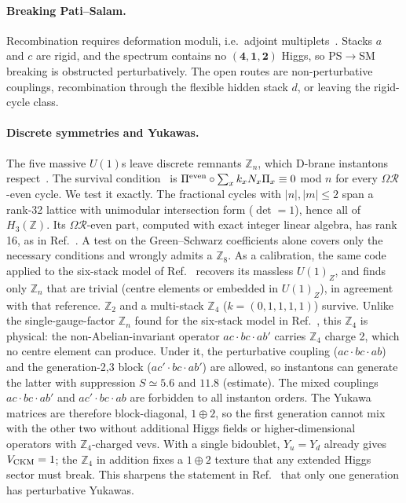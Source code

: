 \documentclass[aps,prd,twocolumn,superscriptaddress,nofootinbib,showkeys]{revtex4-2}
\begin{document}
\paragraph{Breaking Pati--Salam.} Recombination requires deformation moduli, i.e.\ adjoint multiplets~\cite{HRS}. Stacks $a$ and $c$ are rigid, and the spectrum contains no $(\mathbf4,\mathbf1,\mathbf2)$ Higgs, so PS$\to$SM breaking is obstructed perturbatively. The open routes are non-perturbative couplings, recombination through the flexible hidden stack $d$, or leaving the rigid-cycle class.

\paragraph{Discrete symmetries and Yukawas.} The five massive $U(1)$s leave discrete remnants $\mathbb Z_n$, which D-brane instantons respect~\cite{HS13,BIZn}. The survival condition~\cite{HS13} is $\Pi^{\rm even}\circ\sum_xk_xN_x\Pi_x\equiv0$ mod $n$ for every $\Omega\mathcal R$-even cycle. We test it exactly. The fractional cycles with $|n|,|m|\le2$ span a rank-32 lattice with unimodular intersection form ($\det=1$), hence all of $H_3(\mathbb Z)$. Its $\Omega\mathcal R$-even part, computed with exact integer linear algebra, has rank 16, as in Ref.~\cite{HS13}. A test on the Green--Schwarz coefficients alone covers only the necessary conditions and wrongly admits a $\mathbb Z_8$. As a calibration, the same code applied to the six-stack model of Ref.~\cite{HS13} recovers its massless $U(1)_Z$, and finds only $\mathbb Z_n$ that are trivial (centre elements or embedded in $U(1)_Z$), in agreement with that reference. $\mathbb Z_2$ and a multi-stack $\mathbb Z_4$ ($k=(0,1,1,1,1)$) survive. Unlike the single-gauge-factor $\mathbb Z_n$ found for the six-stack model in Ref.~\cite{HS13}, this $\mathbb Z_4$ is physical: the non-Abelian-invariant operator $ac\cdot bc\cdot ab'$ carries $\mathbb Z_4$ charge 2, which no centre element can produce. Under it, the perturbative coupling ($ac\cdot bc\cdot ab$) and the generation-2,3 block ($ac'\cdot bc\cdot ab'$) are allowed, so instantons can generate the latter with suppression $S\simeq5.6$ and $11.8$ (estimate). The mixed couplings $ac\cdot bc\cdot ab'$ and $ac'\cdot bc\cdot ab$ are forbidden to all instanton orders. The Yukawa matrices are therefore block-diagonal, $1\oplus2$, so the first generation cannot mix with the other two without additional Higgs fields or higher-dimensional operators with $\mathbb Z_4$-charged vevs. With a single bidoublet, $Y_u=Y_d$ already gives $V_{\rm CKM}=1$; the $\mathbb Z_4$ in addition fixes a $1\oplus2$ texture that any extended Higgs sector must break. This sharpens the statement in Ref.~\cite{HRS} that only one generation has perturbative Yukawas.
\end{document}
